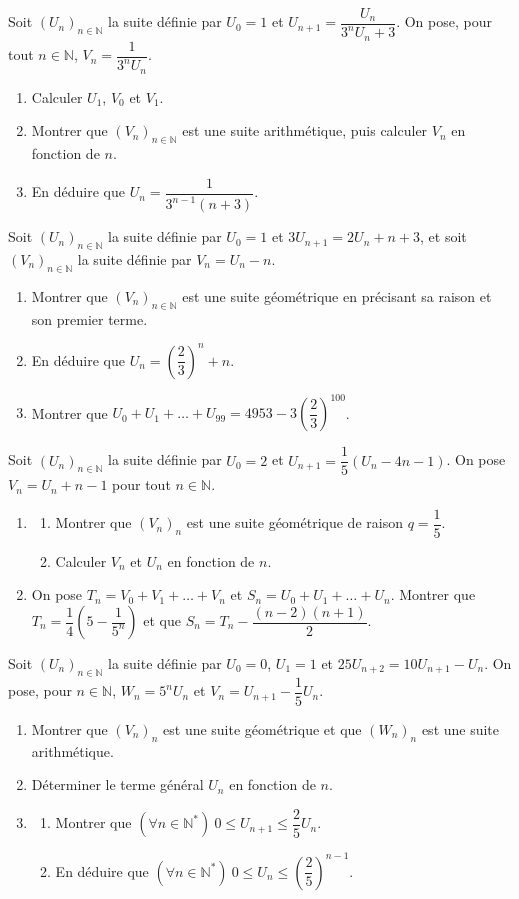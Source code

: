 Soit $(U_n)_{n\in\mathbb{N}}$ la suite définie par $U_0=1$ et $U_{n+1}=\dfrac{U_n}{3^nU_n+3}$. On pose, pour tout $n\in\mathbb{N}$, $V_n=\dfrac{1}{3^nU_n}$.
\begin{enumerate}
\item Calculer $U_1$, $V_0$ et $V_1$.
\item Montrer que $(V_n)_{n\in\mathbb{N}}$ est une suite arithmétique, puis calculer $V_n$ en fonction de $n$.
\item En déduire que $U_n=\dfrac{1}{3^{n-1}(n+3)}$.
\end{enumerate}
\fin
{}
Soit $(U_n)_{n\in\mathbb{N}}$ la suite définie par $U_0=1$ et $3U_{n+1}=2U_n+n+3$, et soit $(V_n)_{n\in\mathbb{N}}$ la suite définie par $V_n=U_n-n$.
\begin{enumerate}
\item Montrer que $(V_n)_{n\in\mathbb{N}}$ est une suite géométrique en précisant sa raison et son premier terme.
\item En déduire que $U_n=\left(\dfrac23\right)^n+n$.
\item Montrer que $U_0+U_1+\dots+U_{99}=4953-3\left(\dfrac23\right)^{100}$.
\end{enumerate}
\fin
{}
Soit $(U_n)_{n\in\mathbb{N}}$ la suite définie par $U_0=2$ et $U_{n+1}=\dfrac15\left(U_n-4n-1\right)$. On pose $V_n=U_n+n-1$ pour tout $n\in\mathbb{N}$.
\begin{enumerate}
\item \begin{enumerate}
\item Montrer que $(V_n)_n$ est une suite géométrique de raison $q=\dfrac15$.
\item Calculer $V_n$ et $U_n$ en fonction de $n$.
\end{enumerate}
\item On pose $T_n=V_0+V_1+\dots+V_n$ et $S_n=U_0+U_1+\dots+U_n$.
Montrer que $T_n=\dfrac14\left(5-\dfrac{1}{5^n}\right)$ et que $S_n=T_n-\dfrac{(n-2)(n+1)}{2}$.
\end{enumerate}
\fin
{}
Soit $(U_n)_{n\in\mathbb{N}}$ la suite définie par $U_0=0$, $U_1=1$ et $25U_{n+2}=10U_{n+1}-U_n$.
On pose, pour $n\in\mathbb{N}$, $W_n=5^nU_n$ et $V_n=U_{n+1}-\dfrac15U_n$.
\begin{enumerate}
\item Montrer que $(V_n)_n$ est une suite géométrique et que $(W_n)_n$ est une suite arithmétique.
\item Déterminer le terme général $U_n$ en fonction de $n$.
\item \begin{enumerate}
\item Montrer que $(\forall n\in\mathbb{N}^*)\ 0\leq U_{n+1}\leq\dfrac25U_n$.
\item En déduire que $(\forall n\in\mathbb{N}^*)\ 0\leq U_n\leq\left(\dfrac25\right)^{n-1}$.
\end{enumerate}
\end{enumerate}
